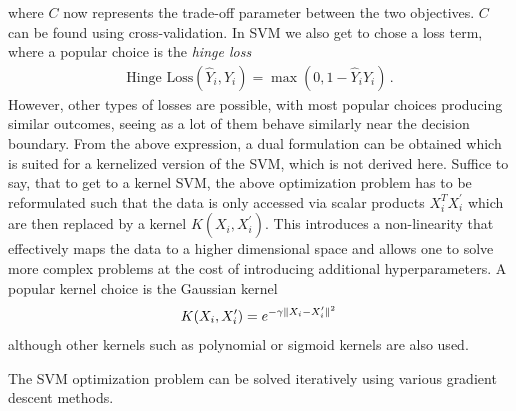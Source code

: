 \documentclass[12pt, a4paper]{scrartcl}
\DeclarePairedDelimiter\norm{\lVert}{\rVert}
\begin{document}
where $C$ now represents the trade-off parameter between the two objectives. $C$ can be found using cross-validation. In SVM we also get to chose a loss term, where a popular choice is the \emph{hinge loss}
\begin{align}
	\text{Hinge Loss}(\hat{Y}_i, Y_i) =  \max(0, 1-\hat{Y}_i  Y_i) \, .
\end{align}
However, other types of losses are possible, with most popular choices producing similar outcomes, seeing as a lot of them behave similarly near the decision boundary.
From the above expression, a dual formulation can be obtained which is suited for a kernelized version of the SVM, which is not derived here.
Suffice to say, that to get to a kernel SVM, the above optimization problem has to be reformulated such that the data is only accessed via scalar products $X_i^T X_i^\prime$ which are then replaced by a kernel $K(X_i, X_i^\prime)$. This introduces a non-linearity that effectively maps the data to a higher dimensional space and allows one to solve more complex problems at the cost of introducing additional hyperparameters.
A popular kernel choice is the Gaussian kernel
\begin{align}
	K(X_i, X_i^\prime) = e^{-\gamma \norm{ X_i - X_i^\prime }^2} \, 
\end{align}
although other kernels such as polynomial or sigmoid kernels are also used.

The SVM optimization problem can be solved iteratively using various gradient descent methods.%
\end{document}

